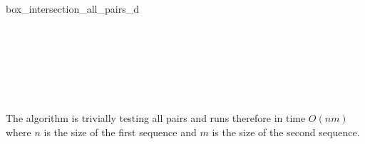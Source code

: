 \begin{ccRefFunction}{box_intersection_all_pairs_d}
\ccSeeAlso

\\

\\
\\

\begin{ccAdvanced}

\\

\end{ccAdvanced}


\ccImplementation

The algorithm is trivially testing all pairs and runs therefore in time
$O(nm)$ where $n$ is the size of the first sequence and $m$ is the
size of the second sequence.

\end{ccRefFunction}


